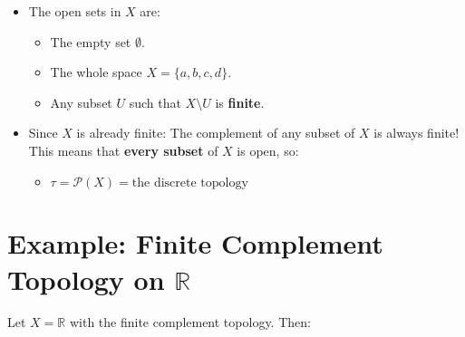 \documentclass{article}
\begin{document}
\begin{itemize}
    \item The open sets in $X$ are:
    \begin{itemize}
        \item The empty set $\emptyset$.
        \item The whole space $X=\{a,b,c,d\}$.
        \item Any subset $U$ such that $X\setminus U$ is \textbf{finite}.
    \end{itemize}
    \item Since $X$ is already finite:
    The complement of any subset of $X$ is always finite!
    This means that \textbf{every subset} of $X$ is open, so:
    \begin{itemize}
        \item $\tau = \mathcal{P}(X)= \text{the discrete topology}$
    \end{itemize}
\end{itemize}

\section{Example: Finite Complement Topology on $\mathbb{R}$}
Let $X=\mathbb{R}$ with the finite complement topology. Then:
\end{document}
